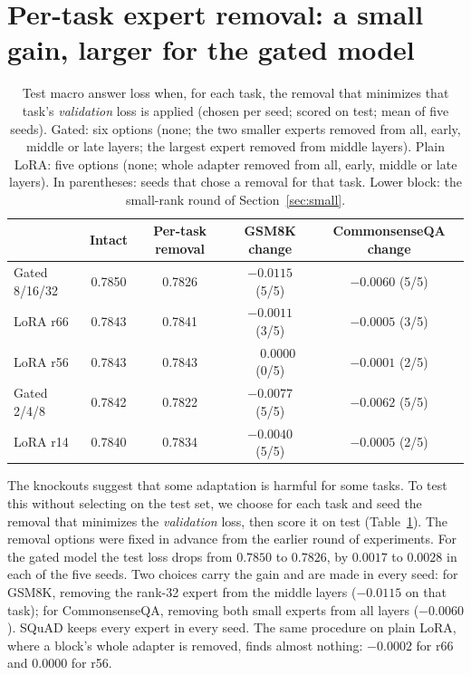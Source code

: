 \documentclass[11pt]{article}
\begin{document}
\section{Per-task expert removal: a small gain, larger for the gated model}
\label{sec:pertask}
\begin{table}[t]
\centering
\caption{Test macro answer loss when, for each task, the removal that minimizes that task's
\emph{validation} loss is applied (chosen per seed; scored on test; mean of five seeds). Gated:
six options (none; the two smaller experts removed from all, early, middle or late layers; the
largest expert removed from middle layers). Plain LoRA: five options (none; whole adapter
removed from all, early, middle or late layers). In parentheses: seeds that chose a removal for
that task. Lower block: the small-rank round of Section~\ref{sec:small}.}
\label{tab:pertask}
\begin{tabular}{lcccc}
\toprule
 & Intact & Per-task removal & GSM8K change & CommonsenseQA change \\
\midrule
Gated 8/16/32 & 0.7850 & 0.7826 & $-0.0115$ (5/5) & $-0.0060$ (5/5) \\
LoRA r66      & 0.7843 & 0.7841 & $-0.0011$ (3/5) & $-0.0005$ (3/5) \\
LoRA r56      & 0.7843 & 0.7843 & $\phantom{-}0.0000$ (0/5) & $-0.0001$ (2/5) \\
\midrule
Gated 2/4/8   & 0.7842 & 0.7822 & $-0.0077$ (5/5) & $-0.0062$ (5/5) \\
LoRA r14      & 0.7840 & 0.7834 & $-0.0040$ (5/5) & $-0.0005$ (2/5) \\
\bottomrule
\end{tabular}
\end{table}
The knockouts suggest that some adaptation is harmful for some tasks. To test this without
selecting on the test set, we choose for each task and seed the removal that minimizes the
\emph{validation} loss, then score it on test (Table~\ref{tab:pertask}). The removal options were
fixed in advance from the earlier round of experiments. For the gated model the test loss drops
from $0.7850$ to $0.7826$, by $0.0017$ to $0.0028$ in each of the five seeds. Two choices carry
the gain and are made in every seed: for GSM8K, removing the rank-32 expert from the middle
layers ($-0.0115$ on that task); for CommonsenseQA, removing both small experts from all layers
($-0.0060$). SQuAD keeps every expert in every seed. The same procedure on plain LoRA, where a
block's whole adapter is removed, finds almost nothing: $-0.0002$ for r66 and $0.0000$ for r56.
\end{document}
